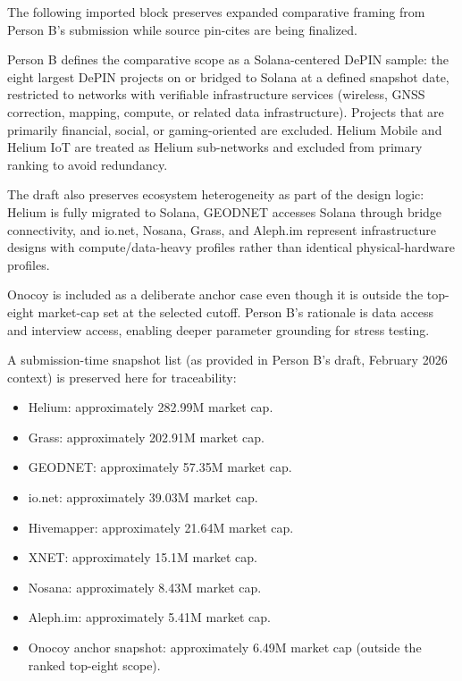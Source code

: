 
The following imported block preserves expanded comparative framing from Person B's submission while source pin-cites are being finalized.

Person B defines the comparative scope as a Solana-centered DePIN sample: the eight largest DePIN projects on or bridged to Solana at a defined snapshot date, restricted to networks with verifiable infrastructure services (wireless, GNSS correction, mapping, compute, or related data infrastructure). Projects that are primarily financial, social, or gaming-oriented are excluded. Helium Mobile and Helium IoT are treated as Helium sub-networks and excluded from primary ranking to avoid redundancy.

The draft also preserves ecosystem heterogeneity as part of the design logic: Helium is fully migrated to Solana, GEODNET accesses Solana through bridge connectivity, and io.net, Nosana, Grass, and Aleph.im represent infrastructure designs with compute/data-heavy profiles rather than identical physical-hardware profiles.

Onocoy is included as a deliberate anchor case even though it is outside the top-eight market-cap set at the selected cutoff. Person B's rationale is data access and interview access, enabling deeper parameter grounding for stress testing.

A submission-time snapshot list (as provided in Person B's draft, February 2026 context) is preserved here for traceability:
\begin{itemize}
    \item Helium: approximately 282.99M market cap.
    \item Grass: approximately 202.91M market cap.
    \item GEODNET: approximately 57.35M market cap.
    \item io.net: approximately 39.03M market cap.
    \item Hivemapper: approximately 21.64M market cap.
    \item XNET: approximately 15.1M market cap.
    \item Nosana: approximately 8.43M market cap.
    \item Aleph.im: approximately 5.41M market cap.
    \item Onocoy anchor snapshot: approximately 6.49M market cap (outside the ranked top-eight scope).
\end{itemize}

